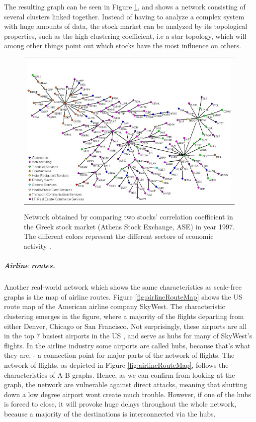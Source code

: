 The resulting graph can be seen in Figure \ref{fig:greekStockMarket}, and shows a network consisting of several clusters linked together. Instead of having to analyze a complex system with huge amounts of data, the stock market can be analyzed by its topological properties, such as the high clustering coefficient, i.e a star topology, which will among other things point out which stocks have the most influence on others. 
\begin{figure}[h]
\centering
\begin{tabular}{@{}c@{}}
\includegraphics[width=1.0\textwidth]{../Figures/greekStockMarket.jpg}
\end{tabular}
\caption[Network of two stocks' correlation coefficient at Athens Stock Exchange, ASE.]{Network obtained by comparing two stocks' correlation coefficient in the Greek stock market (Athens Stock Exchange, ASE) in year 1997. The different colors represent the different sectors of economic activity \cite{greekStockMarket}.
\label{fig:greekStockMarket}}
\end{figure}

\subparagraph{Airline routes.}
Another real-world network which shows the same characteristics as scale-free graphs is the map of airline routes. Figure \ref{fig:airlineRouteMap} shows the US route map of the American airline company SkyWest. The characteristic clustering emerges in the figure, where a majority of the flights departing from either Denver, Chicago or San Francisco. Not surprisingly, these airports are all in the top 7 busiest airports in the US \cite{busiestAirports}, and serve as hubs for many of SkyWest's flights. In the airline industry some airports are called hubs, because that's what they are, - a connection point for major parts of the network of flights. The network of flights, as depicted in Figure \ref{fig:airlineRouteMap}, follows the characteristics of A-B graphs. Hence, as we can confirm from looking at the graph, the network are vulnerable against direct attacks, meaning that shutting down a low degree airport wont create much trouble. However, if one of the hubs is forced to close, it will provoke huge delays throughout the whole network, because a majority of the destinations is interconnected via the hubs. 



